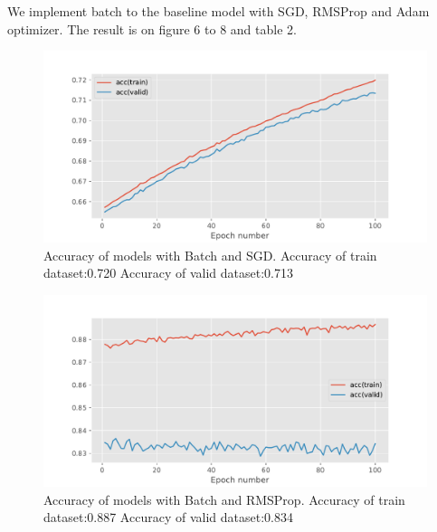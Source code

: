 \documentclass{article}
\begin{document}
We implement batch to the baseline model with SGD, RMSProp and Adam optimizer.
The result is on figure 6 to 8 and table 2.
\begin{figure}[h]
\vskip 5mm
\begin{center}
\centerline{\includegraphics[width=\columnwidth]{f.pdf}}
\caption{Accuracy of models with Batch and SGD. \n
Accuracy of train dataset:0.720 \n
Accuracy of valid dataset:0.713
}
\end{center}
\vskip -5mm
\end{figure}

\begin{figure}[h]
\vskip 5mm
\begin{center}
\centerline{\includegraphics[width=\columnwidth]{g.pdf}}
\caption{Accuracy of models with Batch and RMSProp. \n
Accuracy of train dataset:0.887 \n
Accuracy of valid dataset:0.834
}
\end{center}
\vskip -5mm
\end{figure}
\end{document}

